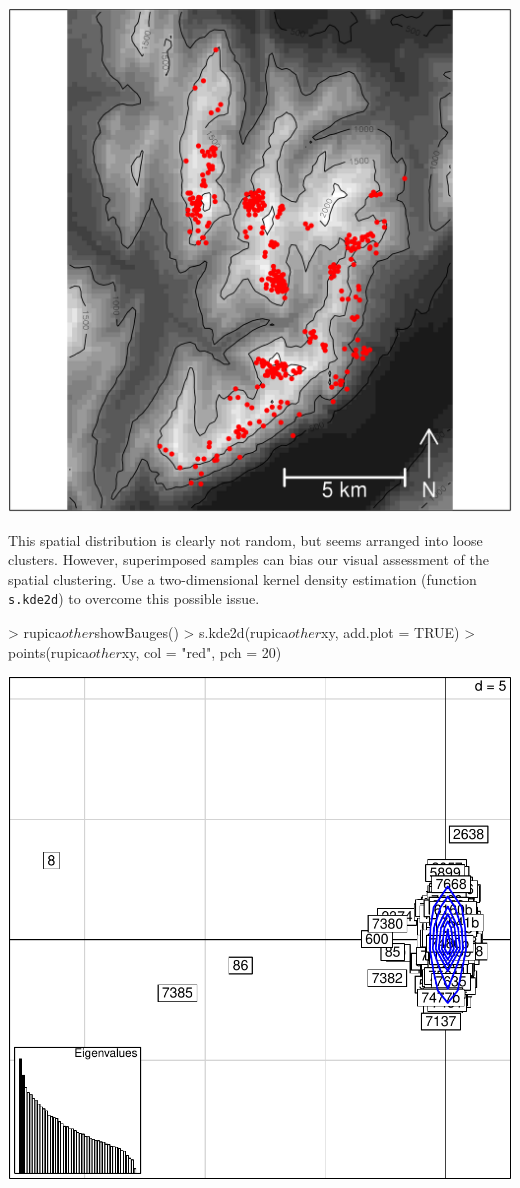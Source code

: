 \documentclass{article}
\begin{document}
\includegraphics{figs/spca-028}

\noindent This spatial distribution is clearly not random, but seems arranged into
loose clusters.
However, superimposed samples can bias our visual assessment of the spatial clustering.
Use a two-dimensional kernel density estimation (function \texttt{s.kde2d}) to overcome this possible
issue.
\begin{Schunk}
\begin{Sinput}
> rupica$other$showBauges()
> s.kde2d(rupica$other$xy, add.plot = TRUE)
> points(rupica$other$xy, col = "red", pch = 20)
\end{Sinput}
\end{Schunk}
\includegraphics{figs/spca-029}
\end{document}
